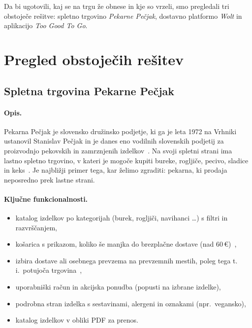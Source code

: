 \documentclass[11pt,a4paper]{article}
\begin{document}
Da bi ugotovili, kaj se na trgu že obnese in kje so vrzeli, smo pregledali tri
obstoječe rešitve: spletno trgovino \emph{Pekarne Pečjak}, dostavno platformo
\emph{Wolt} in aplikacijo \emph{Too Good To Go}.

\section{Pregled obstoječih rešitev}

\subsection{Spletna trgovina Pekarne Pečjak}

\paragraph{Opis.}
Pekarna Pečjak je slovensko družinsko podjetje, ki ga je leta 1972 na Vrhniki
ustanovil Stanislav Pečjak in je danes eno vodilnih slovenskih podjetij za
proizvodnjo pekovskih in zamrznjenih izdelkov~\cite{pecjak-zgodba}. Na svoji
spletni strani ima lastno spletno trgovino, v kateri je mogoče kupiti bureke,
rogljiče, pecivo, sladice in keks~\cite{pecjak-trgovina}. Je najbližji primer
tega, kar želimo zgraditi: pekarna, ki prodaja neposredno prek lastne strani.

\paragraph{Ključne funkcionalnosti.}
\begin{itemize}
  \item katalog izdelkov po kategorijah (burek, rogljiči, navihanci \dots)
        s filtri in razvrščanjem,
  \item košarica s prikazom, koliko še manjka do brezplačne dostave
        (nad 60\,€)~\cite{pecjak-trgovina},
  \item izbira dostave ali osebnega prevzema na prevzemnih mestih,
        poleg tega t.\,i.\ potujoča trgovina~\cite{pecjak-domov},
  \item uporabniški račun in akcijska ponudba (popusti na izbrane izdelke),
  \item podrobna stran izdelka s sestavinami, alergeni in oznakami
        (npr.\ vegansko),
  \item katalog izdelkov v obliki PDF za prenos.
\end{itemize}
\end{document}
